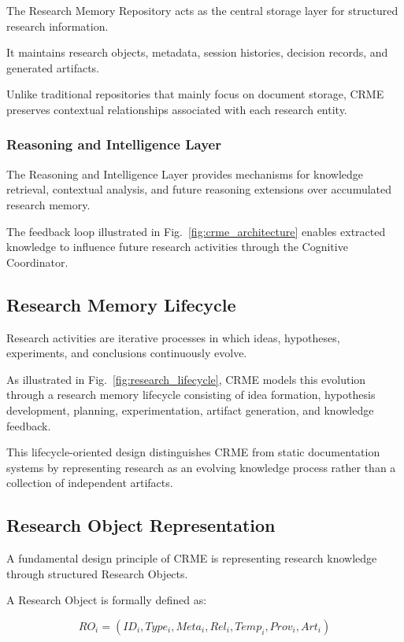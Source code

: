 The Research Memory Repository acts as the central storage layer for structured research information.

It maintains research objects, metadata, session histories, decision records, and generated artifacts.

Unlike traditional repositories that mainly focus on document storage, CRME preserves contextual relationships associated with each research entity.


\subsubsection{Reasoning and Intelligence Layer}

The Reasoning and Intelligence Layer provides mechanisms for knowledge retrieval, contextual analysis, and future reasoning extensions over accumulated research memory.

The feedback loop illustrated in Fig.~\ref{fig:crme_architecture} enables extracted knowledge to influence future research activities through the Cognitive Coordinator.


\subsection{Research Memory Lifecycle}

Research activities are iterative processes in which ideas, hypotheses, experiments, and conclusions continuously evolve.

As illustrated in Fig.~\ref{fig:research_lifecycle}, CRME models this evolution through a research memory lifecycle consisting of idea formation, hypothesis development, planning, experimentation, artifact generation, and knowledge feedback.

This lifecycle-oriented design distinguishes CRME from static documentation systems by representing research as an evolving knowledge process rather than a collection of independent artifacts.


\subsection{Research Object Representation}

A fundamental design principle of CRME is representing research knowledge through structured Research Objects.

A Research Object is formally defined as:

\[
RO_i =
(ID_i,Type_i,Meta_i,Rel_i,Temp_i,Prov_i,Art_i)
\]

